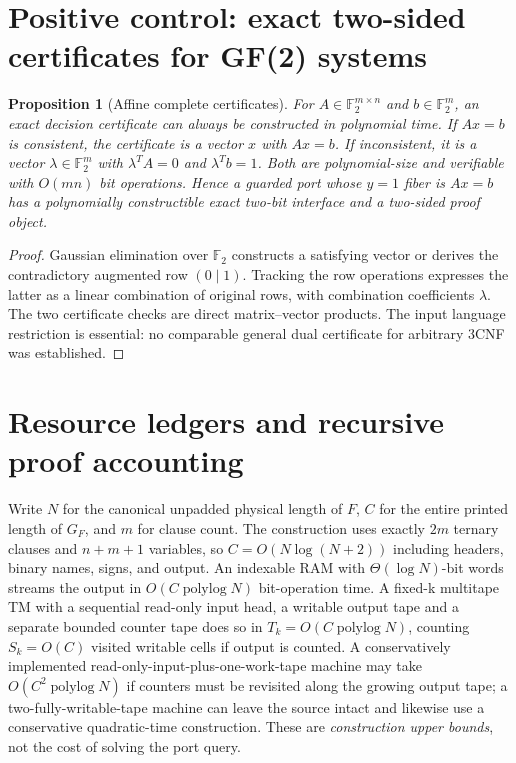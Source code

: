 \documentclass[11pt]{article}
\newtheorem{proposition}[theorem]{Proposition}
\begin{document}
\section{Positive control: exact two-sided certificates for GF(2) systems}
\begin{proposition}[Affine complete certificates]
For $A\in\mathbb F_2^{m\times n}$ and $b\in\mathbb F_2^m$, an exact decision certificate can always be constructed in polynomial time. If $Ax=b$ is consistent, the certificate is a vector $x$ with $Ax=b$. If inconsistent, it is a vector $\lambda\in\mathbb F_2^m$ with $\lambda^TA=0$ and $\lambda^Tb=1$. Both are polynomial-size and verifiable with $O(mn)$ bit operations. Hence a guarded port whose $y=1$ fiber is $Ax=b$ has a polynomially constructible exact two-bit interface and a two-sided proof object.
\end{proposition}
\begin{proof}
Gaussian elimination over $\mathbb F_2$ constructs a satisfying vector or derives the contradictory augmented row $(0\mid1)$. Tracking the row operations expresses the latter as a linear combination of original rows, with combination coefficients $\lambda$. The two certificate checks are direct matrix--vector products. The input language restriction is essential: no comparable general dual certificate for arbitrary 3CNF was established.
\end{proof}

\section{Resource ledgers and recursive proof accounting}
Write $N$ for the canonical unpadded physical length of $F$, $C$ for the entire printed length of $G_F$, and $m$ for clause count. The construction uses exactly $2m$ ternary clauses and $n+m+1$ variables, so $C=O(N\log(N+2))$ including headers, binary names, signs, and output. An indexable RAM with $\Theta(\log N)$-bit words streams the output in $O(C\operatorname{polylog}N)$ bit-operation time. A fixed-k multitape TM with a sequential read-only input head, a writable output tape and a separate bounded counter tape does so in $T_k=O(C\operatorname{polylog}N)$, counting $S_k=O(C)$ visited writable cells if output is counted. A conservatively implemented read-only-input-plus-one-work-tape machine may take $O(C^2\operatorname{polylog}N)$ if counters must be revisited along the growing output tape; a two-fully-writable-tape machine can leave the source intact and likewise use a conservative quadratic-time construction. These are \emph{construction upper bounds}, not the cost of solving the port query.
\end{document}
